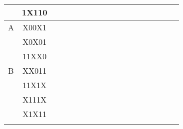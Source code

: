 \documentclass{article}
\begin{document}
\begin{flushleft}
\begin{tabular}{|c|c|r*{15}{|c}|}
    & 1X110&\makecell{ }&\makecell{ }&\makecell{ }&\makecell{ }&\makecell{ }&\makecell{ }&\makecell{ }&\makecell{ }&\makecell{ }&\makecell{ }&&\makecell{ }&\makecell{ }&\makecell{ }&\\ [-1.6ex] \hline\noalign{\vspace{\dimexpr 1.6ex-\doublerulesep}} \hline
    A & X00X1&&&\makecell{ }&\makecell{ }&\makecell{ }&\makecell{ }&\makecell{ }&&&\makecell{ }&\makecell{ }&\makecell{ }&\makecell{ }&\makecell{ }&\makecell{ }\\ \hline
    & X0X01&&\makecell{ }&&\makecell{ }&\makecell{ }&\makecell{ }&\makecell{ }&&\makecell{ }&&\makecell{ }&\makecell{ }&\makecell{ }&\makecell{ }&\makecell{ }\\ [-1.6ex] \hline\noalign{\vspace{\dimexpr 1.6ex-\doublerulesep}} \hline
    & 11XX0&\makecell{ }&\makecell{ }&\makecell{ }&\makecell{ }&\makecell{ }&\makecell{ }&\makecell{ }&\makecell{ }&\makecell{ }&\makecell{ }&\makecell{ }&&&&\\ [-1.6ex] \hline\noalign{\vspace{\dimexpr 1.6ex-\doublerulesep}} \hline
    B & XX011&\makecell{ }&&\makecell{ }&\makecell{ }&\makecell{ }&\makecell{ }&\makecell{ }&\makecell{ }&&\makecell{ }&\makecell{ }&\makecell{ }&\makecell{ }&\makecell{ }&\makecell{ }\\ \hline
    & 11X1X&\makecell{ }&\makecell{ }&\makecell{ }&\makecell{ }&\makecell{ }&\makecell{ }&\makecell{ }&\makecell{ }&\makecell{ }&\makecell{ }&\makecell{ }&\makecell{ }&&\makecell{ }&\\ [-1.6ex] \hline\noalign{\vspace{\dimexpr 1.6ex-\doublerulesep}} \hline
    & X111X&\makecell{ }&\makecell{ }&\makecell{ }&\makecell{ }&\makecell{ }&\makecell{ }&&\makecell{ }&\makecell{ }&\makecell{ }&\makecell{ }&\makecell{ }&\makecell{ }&\makecell{ }&\\ [-1.6ex] \hline\noalign{\vspace{\dimexpr 1.6ex-\doublerulesep}} \hline
    & X1X11&\makecell{ }&\makecell{ }&\makecell{ }&\makecell{ }&\makecell{ }&\makecell{ }&\makecell{ }&\makecell{ }&\makecell{ }&\makecell{ }&\makecell{ }&\makecell{ }&\makecell{ }&\makecell{ }&\makecell{ }\\ [-1.6ex] \hline\noalign{\vspace{\dimexpr 1.6ex-\doublerulesep}} \hline

\end{tabular}
\end{flushleft}
\end{document}

